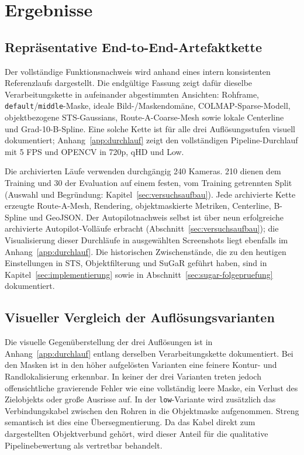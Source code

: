 \section{Ergebnisse}

\subsection{Repräsentative End-to-End-Artefaktkette}

Der vollständige Funktionsnachweis wird anhand eines intern konsistenten
Referenzlaufs dargestellt. Die endgültige Fassung zeigt dafür dieselbe
Verarbeitungskette in aufeinander abgestimmten Ansichten: Rohframe,
\texttt{default}/\texttt{middle}-Maske, ideale Bild-/Maskendomäne,
COLMAP-Sparse-Modell, objektbezogene STS-Gaussians, Route-A-Coarse-Mesh sowie
lokale Centerline und Grad-10-B-Spline. Eine solche Kette ist für alle drei
Auflösungsstufen visuell dokumentiert; Anhang~\ref{app:durchlauf} zeigt den
vollständigen Pipeline-Durchlauf mit 5 FPS und OPENCV in 720p, qHD und Low.

Die archivierten Läufe verwenden durchgängig 240 Kameras. 210 dienen dem
Training und 30 der Evaluation auf einem festen, vom Training getrennten
Split (Auswahl und Begründung: Kapitel~\ref{sec:versuchsaufbau}). Jede
archivierte Kette erzeugte Route-A-Mesh,
Rendering, objektmaskierte Metriken, Centerline, B-Spline und GeoJSON. Der
Autopilotnachweis selbst ist über neun erfolgreiche archivierte Autopilot-Volläufe erbracht
(Abschnitt~\ref{sec:versuchsaufbau}); die Visualisierung dieser Durchläufe in
ausgewählten Screenshots liegt ebenfalls im Anhang~\ref{app:durchlauf}. Die
historischen Zwischenstände, die zu den heutigen Einstellungen in STS,
Objektfilterung und SuGaR geführt haben, sind in
Kapitel~\ref{sec:implementierung} sowie in
Abschnitt~\ref{sec:sugar-folgepruefung} dokumentiert.

\subsection{Visueller Vergleich der Auflösungsvarianten}
\label{sec:visueller-aufloesungsvergleich}

Die visuelle Gegenüberstellung der drei Auflösungen ist in
Anhang~\ref{app:durchlauf} entlang derselben Verarbeitungskette dokumentiert.
Bei
den Masken ist in den höher aufgelösten Varianten eine feinere Kontur- und
Randlokalisierung erkennbar. In keiner der drei Varianten treten jedoch
offensichtliche gravierende Fehler wie eine vollständig leere Maske, ein
Verlust des Zielobjekts oder große Ausrisse auf. In der \texttt{low}-Variante
wird zusätzlich das Verbindungskabel zwischen den Rohren in die Objektmaske
aufgenommen. Streng semantisch ist dies eine Übersegmentierung. Da das Kabel
direkt zum dargestellten Objektverbund gehört, wird dieser Anteil für die
qualitative Pipelinebewertung als vertretbar behandelt.

